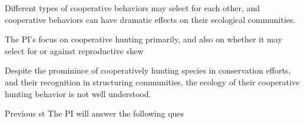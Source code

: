 

Different types of cooperative behaviors may select for each other, and cooperative behaviors can have dramatic effects on their ecological communities.

The PI's focus on cooperative hunting primarily, and also on whether it may select for or against reproductive skew

Despite the prominince of cooperatively hunting species in conservation efforts, and their recognition in structuring communities, the ecology of their cooperative hunting behavior is not well understood.



Previous st
The PI will answer the following ques


